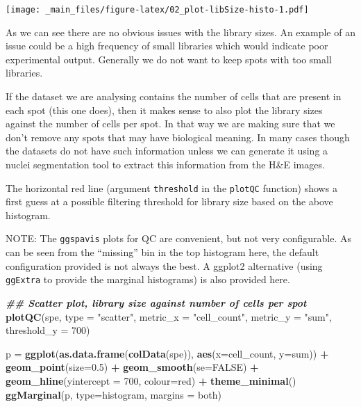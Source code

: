\documentclass[
]{book}
\newenvironment{Shaded}{\begin{snugshade}}{\end{snugshade}}
\newcommand{\AttributeTok}[1]{\textcolor[rgb]{0.13,0.29,0.53}{#1}}
\newcommand{\ConstantTok}[1]{\textcolor[rgb]{0.56,0.35,0.01}{#1}}
\newcommand{\DecValTok}[1]{\textcolor[rgb]{0.00,0.00,0.81}{#1}}
\newcommand{\DocumentationTok}[1]{\textcolor[rgb]{0.56,0.35,0.01}{\textbf{\textit{#1}}}}
\newcommand{\FloatTok}[1]{\textcolor[rgb]{0.00,0.00,0.81}{#1}}
\newcommand{\FunctionTok}[1]{\textcolor[rgb]{0.13,0.29,0.53}{\textbf{#1}}}
\newcommand{\NormalTok}[1]{#1}
\newcommand{\OtherTok}[1]{\textcolor[rgb]{0.56,0.35,0.01}{#1}}
\newcommand{\SpecialCharTok}[1]{\textcolor[rgb]{0.81,0.36,0.00}{\textbf{#1}}}
\newcommand{\StringTok}[1]{\textcolor[rgb]{0.31,0.60,0.02}{#1}}
\begin{document}
\texttt{[image: \_main\_files/figure-latex/02\_plot-libSize-histo-1.pdf]}

As we can see there are no obvious issues with the library sizes. An example of an issue could be a high frequency of small libraries which would indicate poor experimental output. Generally we do not want to keep spots with too small libraries.

If the dataset we are analysing contains the number of cells that are present in each spot (this one does), then it makes sense to also plot the library sizes against the number of cells per spot. In that way we are making sure that we don't remove any spots that may have biological meaning. In many cases though the datasets do not have such information unless we can generate it using a nuclei segmentation tool to extract this information from the H\&E images.

The horizontal red line (argument \texttt{threshold} in the \texttt{plotQC} function) shows a first guess at a possible filtering threshold for library size based on the above histogram.

NOTE: The \texttt{ggspavis} plots for QC are convenient, but not very configurable. As can be seen from the ``missing'' bin in the top histogram here, the default configuration provided is not always the best. A ggplot2 alternative (using \texttt{ggExtra} to provide the marginal histograms) is also provided here.

\begin{Shaded}
\begin{Highlighting}[]
\DocumentationTok{\#\# Scatter plot, library size against number of cells per spot}
\FunctionTok{plotQC}\NormalTok{(spe, }\AttributeTok{type =} \StringTok{"scatter"}\NormalTok{, }
       \AttributeTok{metric\_x =} \StringTok{"cell\_count"}\NormalTok{, }\AttributeTok{metric\_y =} \StringTok{"sum"}\NormalTok{, }
       \AttributeTok{threshold\_y =} \DecValTok{700}\NormalTok{)}

\NormalTok{p }\OtherTok{=} \FunctionTok{ggplot}\NormalTok{(}\FunctionTok{as.data.frame}\NormalTok{(}\FunctionTok{colData}\NormalTok{(spe)), }\FunctionTok{aes}\NormalTok{(}\AttributeTok{x=}\NormalTok{cell\_count, }\AttributeTok{y=}\NormalTok{sum)) }\SpecialCharTok{+}
  \FunctionTok{geom\_point}\NormalTok{(}\AttributeTok{size=}\FloatTok{0.5}\NormalTok{) }\SpecialCharTok{+} 
  \FunctionTok{geom\_smooth}\NormalTok{(}\AttributeTok{se=}\ConstantTok{FALSE}\NormalTok{) }\SpecialCharTok{+}
  \FunctionTok{geom\_hline}\NormalTok{(}\AttributeTok{yintercept =} \DecValTok{700}\NormalTok{, }\AttributeTok{colour=}\StringTok{\textquotesingle{}red\textquotesingle{}}\NormalTok{) }\SpecialCharTok{+} 
  \FunctionTok{theme\_minimal}\NormalTok{()}
\FunctionTok{ggMarginal}\NormalTok{(p, }\AttributeTok{type=}\StringTok{\textquotesingle{}histogram\textquotesingle{}}\NormalTok{, }\AttributeTok{margins =} \StringTok{\textquotesingle{}both\textquotesingle{}}\NormalTok{)}
\end{Highlighting}
\end{Shaded}
\end{document}
